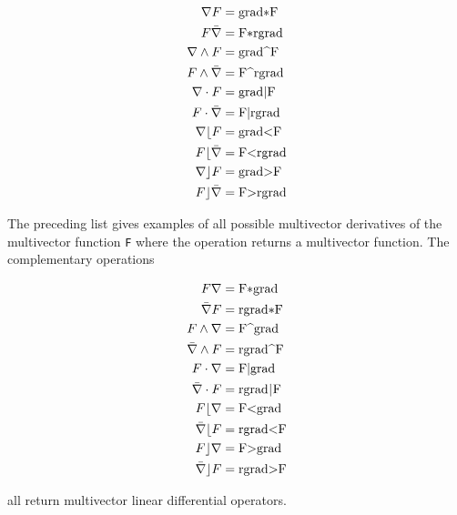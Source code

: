 \documentclass[12pt]{report}
\newcommand{\W}{\wedge}
\newcommand{\T}[1]{\texttt{#1}}
\begin{document}
      \begin{align*}
            \nabla F &=  \mbox{\lstinline!grad*F!} \\
            F \bar{\nabla} &=  \mbox{\lstinline!F*rgrad!} \\
            \nabla \W F &=  \mbox{\lstinline!grad^F!} \\
            F \W \bar{\nabla} &=  \mbox{\lstinline!F^rgrad!} \\
            \nabla \cdot F &=  \mbox{\lstinline!grad|F!} \\
            F \cdot \bar{\nabla} &=  \mbox{\lstinline!F|rgrad!} \\
            \nabla \lfloor F &=  \mbox{\lstinline!grad<F!} \\
            F \lfloor \bar{\nabla} &=  \mbox{\lstinline!F<rgrad!} \\
            \nabla \rfloor F &=  \mbox{\lstinline!grad>F!} \\
            F \rfloor \bar{\nabla} &= \mbox{\lstinline!F>rgrad!}
      \end{align*}

The preceding list gives examples of all possible multivector
derivatives of the multivector function \T{F} where the operation returns
a multivector function. The complementary operations

      \begin{align*}
            F \nabla &=  \mbox{\lstinline!F*grad!} \\
            \bar{\nabla} F &=  \mbox{\lstinline!rgrad*F!} \\
            F \W \nabla &=  \mbox{\lstinline!F^grad!} \\
            \bar{\nabla} \W F &=  \mbox{\lstinline!rgrad^F!} \\
            F \cdot \nabla &=  \mbox{\lstinline!F|grad!} \\
            \bar{\nabla}\cdot F &=  \mbox{\lstinline!rgrad|F!} \\
            F \lfloor \nabla &=  \mbox{\lstinline!F<grad!} \\
            \bar{\nabla} \lfloor F &=  \mbox{\lstinline!rgrad<F!} \\
            F \rfloor \nabla &=  \mbox{\lstinline!F>grad!} \\
            \bar{\nabla} \rfloor F &= \mbox{\lstinline!rgrad>F!}
      \end{align*}

all return multivector linear differential operators.
\end{document}
